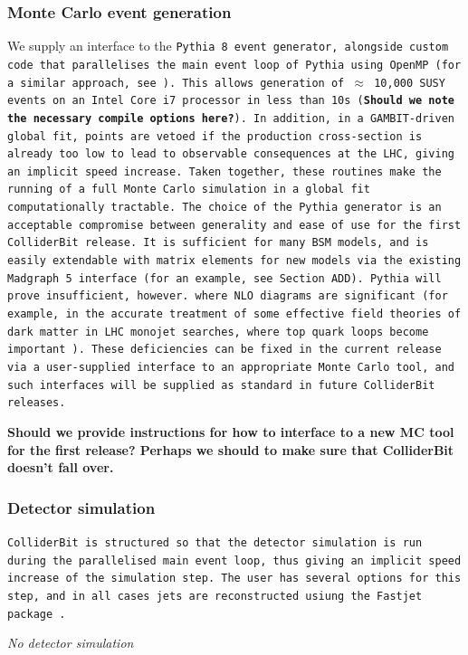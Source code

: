 \subsubsection{Monte Carlo event generation}

We supply an interface to the \tt Pythia 8 \rm event generator, alongside custom code that parallelises the main event loop of \tt Pythia \rm using \tt OpenMP \rm (for a similar approach, see~\cite{Lester:2005je}). This allows generation of $\approx$ 10,000 SUSY events on an Intel Core i7 processor in less than 10s (\textbf{Should we note the necessary compile options here?}). In addition, in a GAMBIT-driven global fit, points are vetoed if the production cross-section is already too low to lead to observable consequences at the LHC, giving an implicit speed increase. Taken together, these routines make the running of a full Monte Carlo simulation in a global fit computationally tractable. The choice of the \tt Pythia \rm generator is an acceptable compromise between generality and ease of use for the first \tt ColliderBit \rm release. It is sufficient for many BSM models, and is easily extendable with matrix elements for new models via the existing \tt Madgraph 5 \rm interface (for an example, see Section ADD). \tt Pythia \rm will prove insufficient, however.  where NLO diagrams are significant (for example, in the accurate treatment of some effective field theories of dark matter in LHC monojet searches, where top quark loops become important~\cite{Buckley:2014fba}). These deficiencies can be fixed in the current release via a user-supplied interface to an appropriate Monte Carlo tool, and such interfaces will be supplied as standard in future \tt ColliderBit \rm releases.

\textbf{Should we provide instructions for how to interface to a new MC tool for the first release? Perhaps we should to make sure that ColliderBit doesn't fall over.}

\subsubsection{Detector simulation}
\tt ColliderBit \rm is structured so that the detector simulation is run during the parallelised main event loop, thus giving an implicit speed increase of the simulation step. The user has several options for this step, and in all cases jets are reconstructed usiung the \tt Fastjet \rm package~\cite{Cacciari:2011ma}.

\begin{center}
\emph{No detector simulation}\\
\end{center}

